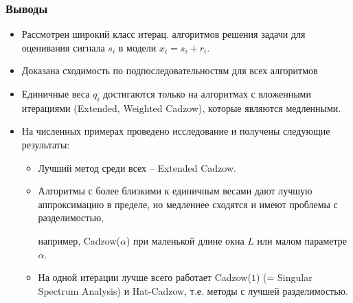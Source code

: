 \documentclass[unicode, notheorems]{beamer}
\begin{document}
%  


\begin{frame}
\frametitle{Выводы}\footnotesize
\begin{itemize}
	\item Рассмотрен широкий класс итерац. алгоритмов решения задачи 
	для оценивания сигнала $s_i$  в модели $x_i=s_i + r_i$.
	\item Доказана сходимость по подпоследовательностям для всех алгоритмов
	\item Единичные веса $q_i$ достигаются только на алгоритмах с вложенными итерациями (Extended, Weighted Cadzow), которые являются медленными.
	\item  На численных примерах проведено исследование и получены следующие результаты:
	\begin{itemize} \footnotesize
		\item Лучший метод среди всех -- Extended Cadzow.
		\item Алгоритмы с более близкими к единичным весами дают лучшую аппроксимацию в пределе, но медленнее сходятся и имеют проблемы с разделимостью,
		
		например, Cadzow($\alpha$) при маленькой  длине окна $L$ или малом параметре $\alpha$.
		\item На одной итерации лучше всего работает Cadzow($1$) (= Singular Spectrum Analysis) и Hat-Cadzow, т.е. методы с лучшей разделимостью.
	\end{itemize}
\end{itemize}

\end{frame}
\end{document}
